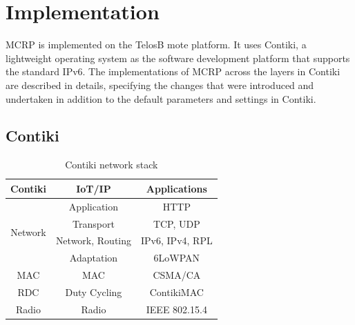 \chapter{Implementation}
\label{implementation}

MCRP is implemented on the TelosB mote platform. It uses Contiki, a lightweight operating system as the software development platform that supports the standard IPv6. The implementations of MCRP across the layers in Contiki are described in details, specifying the changes that were introduced and undertaken in addition to the default parameters and settings in Contiki.

 
\section{Contiki}

\begin{table}
  \centering
    \begin{tabular}{|c|c|c|}
      \hline
      Contiki & IoT/IP & Applications \\
      \hline \hline
      \multirow{4}{*}{Network} 
        & Application & HTTP \\
        \cline{2-3}
        & Transport & TCP, UDP \\
        \cline{2-3}
        & Network, Routing & IPv6, IPv4, RPL \\
        \cline{2-3}
        & Adaptation & 6LoWPAN \\
      \hline \hline
      
      MAC & MAC & CSMA/CA \\
      \hline
      RDC & Duty Cycling & ContikiMAC \\
      \hline
      Radio & Radio & IEEE 802.15.4 \\
      \hline
    \end{tabular}
    \caption{Contiki network stack}
    \label{table:1}
\end{table}

